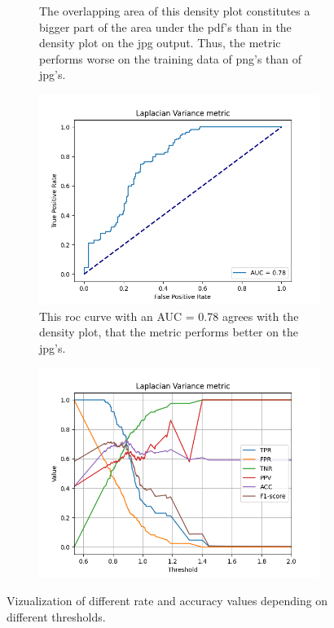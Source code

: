 \begin{figure}[H]
\begin{subfigure}[t]{0.48\textwidth}
	    \caption{The overlapping area of this density plot constitutes a bigger part of the area under the pdf's than in the density plot on the jpg output. Thus, the metric performs worse on the training data of png's than of jpg's.}
	    \label{fig:LV_dens_png}
    \end{subfigure}\hspace{1em}

    \begin{subfigure}[t]{0.48\textwidth}
        \includegraphics[width=\textwidth]{Figures/lv/output_roc_lv_png.png}
        \caption{This roc curve with an AUC = 0.78 agrees with the density plot, that the metric performs better on the jpg's.}
        \label{fig:LV_roc}
    \end{subfigure}\hspace{1em}
    \begin{subfigure}[t]{0.48\textwidth}
        \includegraphics[width=\textwidth]{Figures/lv/threshold_test_scores_lv_png.png}
        \caption{}
        \label{fig:LV_thresh}
    \end{subfigure}\hspace{1em}
    \caption{Vizualization of different rate and accuracy values depending on different thresholds.}
    \label{fig:LV_png}
\end{figure}

